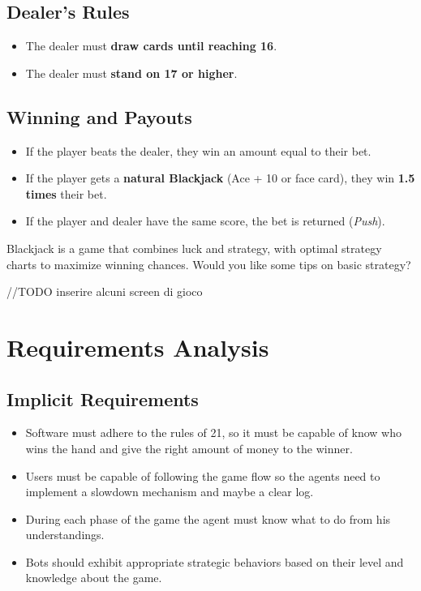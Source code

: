 \section{Dealer's Rules}

\begin{itemize}
    \item The dealer must \textbf{draw cards until reaching 16}.
    \item The dealer must \textbf{stand on 17 or higher}.
\end{itemize}

\section{Winning and Payouts}

\begin{itemize}
    \item If the player beats the dealer, they win an amount equal to their bet.
    \item If the player gets a \textbf{natural Blackjack} (Ace + 10 or face card), they win \textbf{1.5 times} their bet.
    \item If the player and dealer have the same score, the bet is returned (\textit{Push}).
\end{itemize}

Blackjack is a game that combines luck and strategy, with optimal strategy charts to maximize winning chances. Would you like some tips on basic strategy?


//TODO inserire alcuni screen di gioco 


\chapter{Requirements Analysis}

\section{Implicit Requirements}
\begin{itemize}
   \item Software must adhere to the rules of 21, so it must be capable of know who wins the hand and give the right amount of money to the winner.
   \item Users must be capable of following the game flow so the agents need to implement a slowdown mechanism and maybe a clear log.
   \item During each phase of the game the agent must know what to do from his understandings.
   \item Bots should exhibit appropriate strategic behaviors based on their level and knowledge about the game.
\end{itemize}

